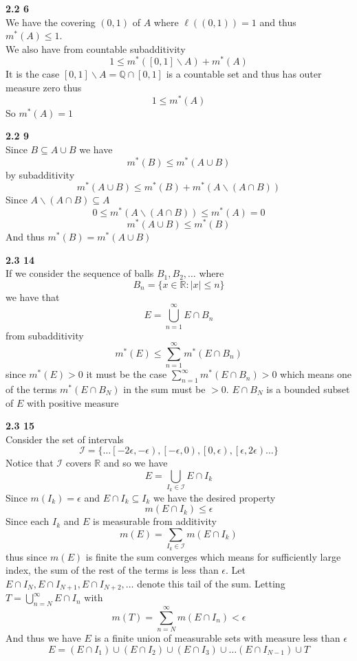 \documentclass[12pt]{article}
\newenvironment{ques}[1]{\textbf{#1}\vspace{1 mm}\\ }{\bigskip}
\theoremstyle{definition}
\renewcommand{\l}{\left }
\renewcommand{\r}{\right }
\newcommand{\R}{\mathbb R}
\newcommand{\Q}{\mathbb Q}
\renewcommand{\-}{\backslash}
\begin{document}
\begin{ques}{2.2 6}
	We have the covering $(0,1)$ of $A$ where $\ell((0,1)) = 1$ and thus
	$m^*(A) \leq 1$.\\
	We also have from countable subadditivity
	$$1 \leq m^*([0,1] \- A) + m^*(A)$$
	It is the case $[0,1] \- A = \Q \cap [0,1]$ is a countable set and thus has
	outer measure zero thus
	$$1 \leq m^*(A)$$
	So $m^*(A) = 1$
\end{ques}

\begin{ques}{2.2 9}
	Since $B \subseteq A \cup B$ we have
	$$m^*(B) \leq m^*(A \cup B)$$
	by subadditivity
	$$m^*(A \cup B) \leq m^*(B) + m^*(A \- (A \cap B))$$
	Since $A \- (A \cap B) \subseteq A$
	$$0 \leq m^*(A\- (A \cap B)) \leq m^*(A) = 0$$
	$$m^*(A \cup B) \leq m^*(B)$$
	And thus $m^*(B) = m^*(A \cup B)$
\end{ques}

\begin{ques}{2.3 14}
	If we consider the sequence of balls $B_1, B_2, \dots$ where 
	$$B_n = \{x \in \R: |x| \leq n\}$$
	we have that
	$$E = \bigcup_{n=1}^\infty E \cap B_n$$
	from subadditivity
	$$m^*(E) \leq \sum_{n=1}^\infty m^*(E \cap B_n)$$
	since $m^*(E) > 0$ it must be the case $\sum_{n=1}^\infty m^*(E \cap B_n) >
	0$ which means one of the terms $m^*(E \cap B_N)$ in the sum must be $> 0$.
	$E \cap B_N$ is a bounded subset of $E$ with positive measure
\end{ques}

\begin{ques}{2.3 15}
	Consider the set of intervals
	$$\mathcal I = \{\dots \l[-2\epsilon , -\epsilon \r),
	\l[-\epsilon, 0\r), \l[0, \epsilon\r), \l[\epsilon, 2\epsilon\r)\dots \}$$
	Notice that $\mathcal I$ covers $\R$ and so we have
	$$E = \bigcup_{I_k \in \mathcal I} E \cap I_k$$
	Since $m(I_k) = \epsilon$ and $E \cap I_k \subseteq I_k$ we have the desired property
	$$m(E \cap I_k) \leq \epsilon$$
	Since each $I_k$ and $E$ is measurable from additivity
	$$m(E) = \sum_{I_k \in \mathcal I} m(E \cap I_k)$$
	thus since $m(E)$ is finite the sum converges which means for sufficiently
	large index, the sum of the rest of the terms is less than $\epsilon$. Let
	$E \cap I_N, E \cap I_{N+1}, E \cap I_{N+2}, \dots$ denote this tail of the
	sum. Letting $T =
	\bigcup_{n = N}^\infty E \cap I_n$ with 
	$$m(T) = \sum_{n=N}^\infty m(E \cap I_n) < \epsilon$$
	And thus we have $E$ is a finite union of measurable sets with measure less
	than $\epsilon$
	$$E = (E \cap I_1) \cup(E \cap I_2) \cup(E \cap I_3) \cup \dots (E \cap
	I_{N-1}) \cup T$$


\end{ques}
\end{document}
